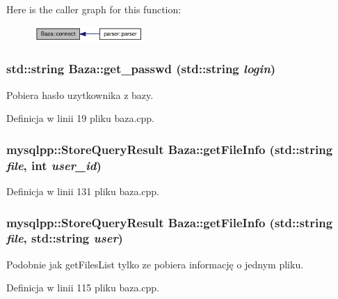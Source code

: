 Here is the caller graph for this function:\nopagebreak
\begin{figure}[H]
\begin{center}
\leavevmode
\includegraphics[width=118pt]{class_baza_bef61cc396e46d347a47c75e9ef8dfde_icgraph}
\end{center}
\end{figure}
\hypertarget{class_baza_a09b37e4665bd7b2f2b8b54f8120f5be}{
\subsubsection[{get\_\-passwd}]{\setlength{\rightskip}{0pt plus 5cm}std::string Baza::get\_\-passwd (std::string {\em login})}}
\label{class_baza_a09b37e4665bd7b2f2b8b54f8120f5be}


Pobiera hasło uzytkownika z bazy. 



Definicja w linii 19 pliku baza.cpp.\hypertarget{class_baza_1d1cfca062ab3117b2b97281df012823}{
\subsubsection[{getFileInfo}]{\setlength{\rightskip}{0pt plus 5cm}mysqlpp::StoreQueryResult Baza::getFileInfo (std::string {\em file}, \/  int {\em user\_\-id})}}
\label{class_baza_1d1cfca062ab3117b2b97281df012823}




Definicja w linii 131 pliku baza.cpp.\hypertarget{class_baza_e4a033a65cb585aa91c15fd8b8fde764}{
\subsubsection[{getFileInfo}]{\setlength{\rightskip}{0pt plus 5cm}mysqlpp::StoreQueryResult Baza::getFileInfo (std::string {\em file}, \/  std::string {\em user})}}
\label{class_baza_e4a033a65cb585aa91c15fd8b8fde764}


Podobnie jak getFilesList tylko ze pobiera informację o jednym pliku. 



Definicja w linii 115 pliku baza.cpp.

